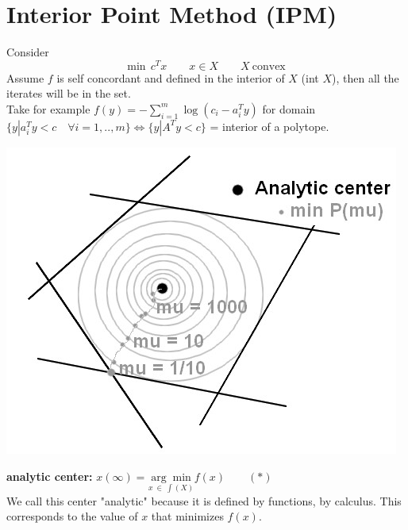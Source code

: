 \section{Interior Point Method (IPM)}
Consider 
$$ \text{min} ~~ c^T x \qquad x \in X \qquad X \ \text{convex}$$
Assume $f$ is self concordant and defined in the interior of $X$ (int $X$), then all the iterates will be in the set.\\
Take for example $f(y) = - \sum_{i = 1}^m \log(c_i - a_i^T y)$ for domain $\lbrace y | a_i^T y < c\quad \forall i = 1,..,m \rbrace \Longleftrightarrow \lbrace y | A^T y < c  \rbrace$ = interior of a polytope.\\
\begin{center}
\includegraphics[scale=0.5]{images/12-fig1.jpg} 
\end{center}

\begin{definition} 
\textbf{analytic center:} $x(\infty) = \underset{x\ \in \ \int(X)}{\arg \min} f(x) \qquad (*)$  \\
We call this center "analytic" because it is defined by functions, by calculus. This corresponds to the value of $x$ that minimizes $f(x)$.
\end{definition}

